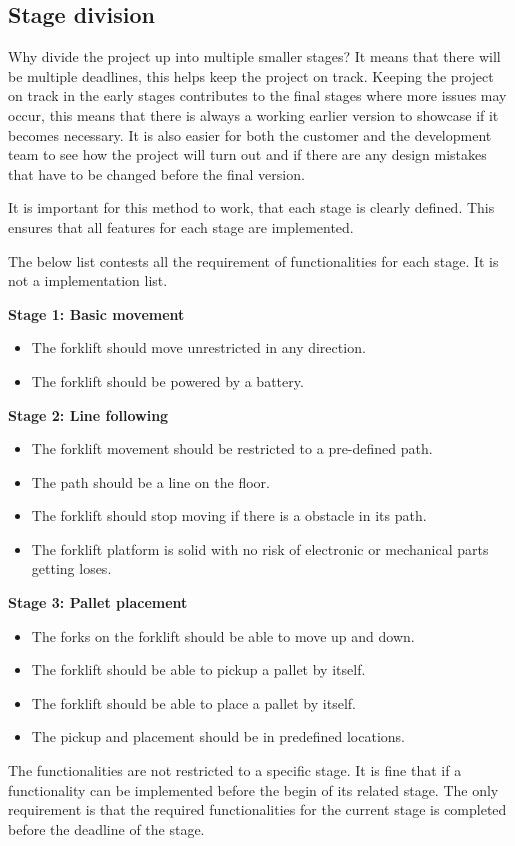 \documentclass[../report.tex]{subfiles}
\begin{document}
    \subsection{Stage division}
    Why divide the project up into multiple smaller stages? It means
    that there will be multiple deadlines, this helps keep the project on
    track. Keeping the project on track in the early stages contributes to the
    final stages where more issues may occur, this means that there is always a
    working earlier version to showcase if it becomes necessary. It is also
    easier for both the customer and the development team to see how the
    project will turn out and if there are any design mistakes that have to be
    changed before the final version.

    It is important for this method to work, that each stage is clearly defined.
    This ensures that all features for each stage are implemented.

    The below list contests all the requirement of functionalities for each
    stage. It is not a implementation list.

    \textbf{Stage 1: Basic movement}
    \begin{itemize}
        \item The forklift should move unrestricted in any direction.
        \item The forklift should be powered by a battery.
    \end{itemize}

    \textbf{Stage 2: Line following}
    \begin{itemize}
        \item The forklift movement should be restricted to a pre-defined path.
        \item The path should be a line on the floor.
        \item The forklift should stop moving if there is a obstacle in its path.
        \item The forklift platform is solid with no risk of electronic or
        mechanical parts getting loses.
    \end{itemize}

    \textbf{Stage 3: Pallet placement}
    \begin{itemize}
        \item The forks on the forklift should be able to move up and down.
        \item The forklift should be able to pickup a pallet by itself.
        \item The forklift should be able to place a pallet by itself.
        \item The pickup and placement should be in predefined locations.
    \end{itemize}

    The functionalities are not restricted to a specific stage. It is fine that
    if a functionality can be implemented before the begin of its related
    stage.
    The only requirement is that the required functionalities for the current
    stage is completed before the deadline of the stage. 
\end{document}
